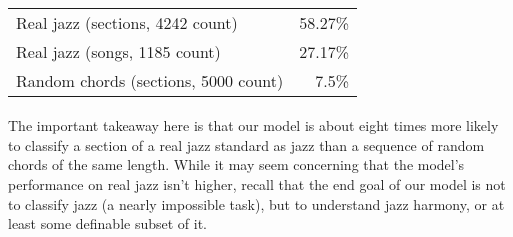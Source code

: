 \documentclass[]{article}
\begin{document}
\paragraph{}
\begin{tabular}{l|r}
	Real jazz (sections, 4242 count) & 58.27\% \\
	Real jazz (songs, 1185 count) & 27.17\% \\
	Random chords (sections, 5000 count) & 7.5\%
\end{tabular}

\paragraph{} The important takeaway here is that our model is about eight times more likely to classify a section of a real jazz standard as jazz than a sequence of random chords of the same length.  While it may seem concerning that the model's performance on real jazz isn't higher, recall that the end goal of our model is not to classify jazz (a nearly impossible task), but to understand jazz harmony, or at least some definable subset of it.
\end{document}
